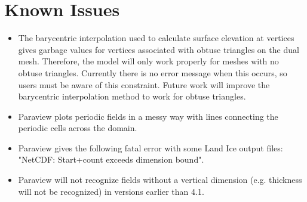 \chapter{Known Issues}


\label{chap:knownissues}

\begin{itemize}
\item{The barycentric interpolation used to calculate surface elevation at vertices gives garbage values for vertices associated with obtuse triangles on the dual mesh.  Therefore, the model will only work properly for meshes with no obtuse triangles.  Currently there is no error message when this occurs, so users must be aware of this constraint.  Future work will improve the barycentric interpolation method to work for obtuse triangles. }

\item{Paraview plots periodic fields in a messy way with lines connecting the periodic cells across the domain.}

\item{Paraview gives the following fatal error with some Land Ice output files: "NetCDF: Start+count exceeds dimension bound".}

\item{Paraview will not recognize fields without a vertical dimension (e.g. thickness will not be recognized) in versions earlier than 4.1.}
\end{itemize}


